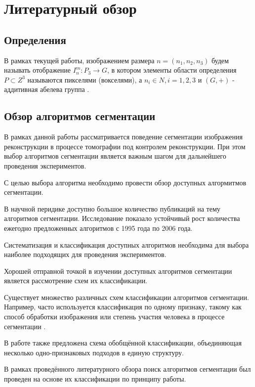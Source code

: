 \section{Литературный обзор}

\subsection{Определения}

В рамках текущей работы, изображением размера \(n=(n_1, n_2, n_3)\) будем называть отображение \(I_n^m : P_3 \rightarrow G\), в котором элементы области определения \(P \subset Z^3\)  называются пикселями (вокселями), а \(n_i \in N, i = 1, 2, 3\) и \((G, +)\) - аддитивная абелева группа \cite{NikolaevPhdthesis}.

\subsection{Обзор алгоритмов сегментации}

В рамках данной работы рассматривается поведение сегментации изображения реконструкции в процессе томографии под контролем реконструкции. При этом выбор алгоритмов сегментации является важным шагом для дальнейшего проведения экспериментов.

С целью выбора алгоритма необходимо провести обзор доступных алгормитмов сегментации.

В научной перидике доступно большое количество публикаций на тему алгоритмов сегментации. Исследование \cite{zhang2006advances} показало устойчивый рост количества ежегодно предложенных алгоритмов с 1995 года по 2006 года.

Систематизация и классификация доступных алгоритмов необходима для выбора наиболее подходящих для проведения экспериментов. 

Хорошей отправной точкой в изучении доступных алгоритмов сегментации является рассмотрение схем их классификации. 

Существует множество различных схем классификации алгоритмов сегментации. Например, часто используется классификация по одному признаку, такому как способ обработки изображения или степень участия человека в процессе сегментации \cite{wirjadi2007survey}.

В работе \cite{ханыков2018классификация} также предложена схема обобщённой классификации, объединяющая несколько одно-признаковых подходов в единую структуру.

В рамках проведённого литературного обзора поиск алгоритмов сегментации был проведен на основе их классификации по принципу работы.

